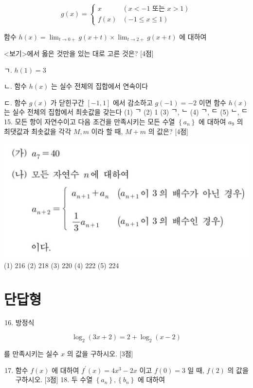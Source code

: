 \documentclass[10pt]{article}
\begin{document}
$$
g(x)= \begin{cases}x & (x<-1 \text { 또는 } x>1) \\ f(x) & (-1 \leq x \leq 1)\end{cases}
$$

함수 $h(x)=\lim _{t \rightarrow 0+} g(x+t) \times \lim _{t \rightarrow 2+} g(x+t)$ 에 대하여

<보기>에서 옳은 것만을 있는 대로 고른 것은? [4점]

ㄱ. $h(1)=3$

ㄴ. 함수 $h(x)$ 는 실수 전체의 집합에서 연속이다

ㄷ. 함수 $g(x)$ 가 닫힌구간 $[-1,1]$ 에서 감소하고 $g(-1)=-2$ 이면 함수 $h(x)$ 는 실수 전체의 집합에서 최솟값을 갖는다
(1) ᄀ
(2) 1
(3) ᄀ, ᄂ (4) ᄀ, ᄃ
(5) ᄂ, ᄃ 15. 모든 항이 자연수이고 다음 조건을 만족시키는 모든 수열 $\left\{a_{n}\right\}$ 에 대하여 $a_{9}$ 의 최댓값과 최솟값을 각각 $M, m$ 이라 할 때, $M+m$ 의 값은? [4점]

\includegraphics[max width=\textwidth, center]{2023_05_19_a9cef858603f6abf5411g-26}
(1) 216
(2) 218
(3) 220
(4) 222
(5) 224

\section{단답형}
\begin{enumerate}
  \setcounter{enumi}{15}
  \item 방정식
\end{enumerate}

$$
\log _{2}(3 x+2)=2+\log _{2}(x-2)
$$

를 만족시키는 실수 $x$ 의 값을 구하시오. [3점]

\begin{enumerate}
  \setcounter{enumi}{16}
  \item 함수 $f(x)$ 에 대하여 $f^{\prime}(x)=4 x^{3}-2 x$ 이고 $f(0)=3$ 일 때, $f(2)$ 의 값을 구하시오. [3점] 18. 두 수열 $\left\{a_{n}\right\},\left\{b_{n}\right\}$ 에 대하여
\end{enumerate}
\end{document}
